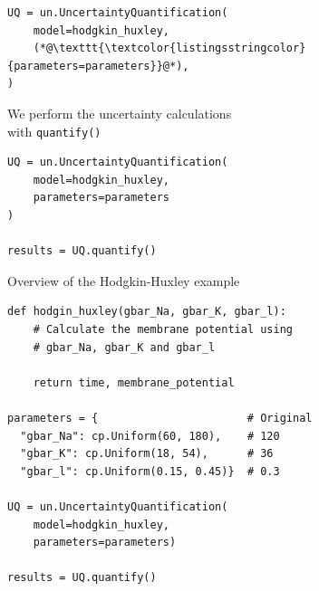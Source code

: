 \documentclass[presentation]{beamer}
\begin{document}
\begin{frame}[fragile]

\begin{lstlisting}
UQ = un.UncertaintyQuantification(
    model=hodgkin_huxley,
    (*@\texttt{\textcolor{listingsstringcolor}{parameters=parameters}}@*),
)
  \end{lstlisting}
\end{frame}


\begin{frame}[fragile]{We perform the uncertainty calculations \\
                       with \lstinline|quantify()|}

\begin{lstlisting}
UQ = un.UncertaintyQuantification(
    model=hodgkin_huxley,
    parameters=parameters
)

results = UQ.quantify()
\end{lstlisting}

\end{frame}








\begin{frame}[fragile]{Overview of the Hodgkin-Huxley example}
\vspace{-3mm}

\begin{lstlisting}
def hodgin_huxley(gbar_Na, gbar_K, gbar_l):
    # Calculate the membrane potential using
    # gbar_Na, gbar_K and gbar_l

    return time, membrane_potential

parameters = {                       # Original
  "gbar_Na": cp.Uniform(60, 180),    # 120
  "gbar_K": cp.Uniform(18, 54),      # 36
  "gbar_l": cp.Uniform(0.15, 0.45)}  # 0.3

UQ = un.UncertaintyQuantification(
    model=hodgkin_huxley,
    parameters=parameters)

results = UQ.quantify()
\end{lstlisting}

\end{frame}


\end{document}
